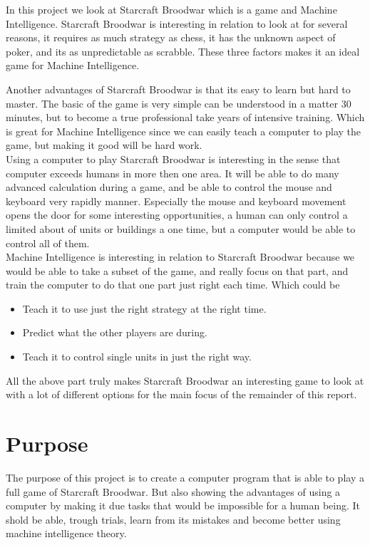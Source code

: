 In this project we look at Starcraft Broodwar which is a \abrts game and Machine Intelligence. Starcraft Broodwar is interesting in relation to look at for several reasons, it requires as much strategy as chess, it has the unknown aspect of poker, and its as unpredictable as scrabble. These three factors makes it an ideal game for Machine Intelligence.

Another advantages of Starcraft Broodwar is that its easy to learn but hard to master. The basic of the game is very simple can be understood in a matter 30 minutes, but to become a true professional take years of intensive training. Which is great for Machine Intelligence since we can easily teach a computer to play the game, but making it good will be hard work.\\

Using a computer to play Starcraft Broodwar is interesting in the sense that computer exceeds humans in more then one area. It will be able to do many advanced calculation during a game, and be able to control the mouse and keyboard very rapidly manner. Especially the mouse and keyboard movement opens the door for some interesting opportunities, a human can only control a limited about of units or buildings a one time, but a computer would be able to control all of them. \\

Machine Intelligence is interesting in relation to Starcraft Broodwar because we would be able to take a subset of the game, and really focus on that part, and train the computer to do that one part just right each time. Which could be
\begin{itemize}
	\item Teach it to use just the right strategy at the right time.
	\item Predict what the other players are during.
	\item Teach it to control single units in just the right way.
\end{itemize}

All the above part truly makes Starcraft Broodwar an interesting game to look at with a lot of different options for the main focus of the remainder of this report.

\section{Purpose}

	The purpose of this project is to create a computer program that is able to play a full game of Starcraft Broodwar. But also showing the advantages of using a computer by making it due tasks that would be impossible for a human being. It shold be able, trough trials, learn from its mistakes and become better using machine intelligence theory. 


